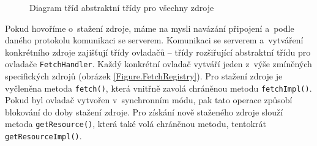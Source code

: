\begin{figure}[H]
  \begin{center}
    \caption{Diagram tříd abstraktní třídy pro všechny zdroje}
    \label{Figure.Resource}
  \end{center}
\end{figure}

Pokud hovoříme o~stažení zdroje, máme na mysli navázání připojení a~podle daného protokolu komunikaci se serverem. Komunikaci se serverem a~vytváření konkrétního zdroje zajišťují třídy ovladačů -- třídy rozšiřující abstraktní třídu pro ovladače \texttt{FetchHandler}. Každý konkrétní ovladač vytváří jeden z~výše zmíněných specifických zdrojů (obrázek \ref{Figure.FetchRegistry}). Pro stažení zdroje je vyčleněna metoda \texttt{fetch()}, která vnitřně zavolá chráněnou metodu \texttt{fetchImpl()}. Pokud byl ovladač vytvořen v~synchronním módu, pak tato operace způsobí blokování do doby stažení zdroje. Pro získání nově staženého zdroje slouží metoda \texttt{getResource()}, která také volá chráněnou metodu, tentokrát \texttt{getResourceImpl()}. 

